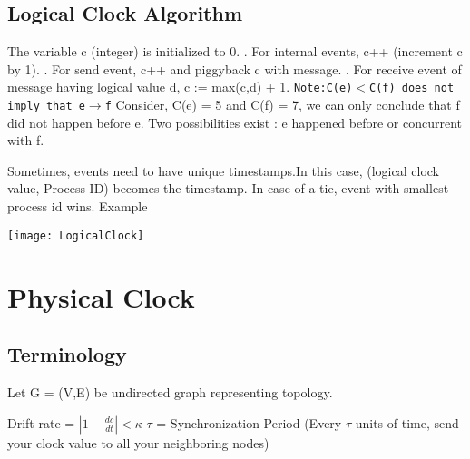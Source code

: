 \documentclass[twoside]{article}
\begin{document}
\subsection{Logical Clock Algorithm}
The variable c (integer) is initialized to 0.
. For internal events, c++ (increment c by 1).
. For send event, c++ and piggyback c with message.
. For receive event of message having logical value d, c := max(c,d) + 1.
\newline
{\tt Note:C(e)$<$C(f) does not imply that e$\rightarrow$f}
\newline
Consider, C(e) = 5 and C(f) = 7, we can only conclude that f did not happen before e. Two possibilities exist : e happened before or concurrent with f.

Sometimes, events need to have unique timestamps.In this case, (logical clock value, Process ID) becomes the timestamp. In case of a tie, event with smallest process id wins.
Example
\begin{center}
\texttt{[image: LogicalClock]}\\
\end{center}

\section{Physical Clock}
\subsection{Terminology}
Let G = (V,E) be undirected graph representing topology.
\begin{center}
\end{center}

Drift rate = $| 1 - \frac{dc}{dt}| < \kappa$
\newline
\newline
$\tau$ = Synchronization Period (Every $\tau$ units of time, send your clock value to all your neighboring nodes)
\end{document}
